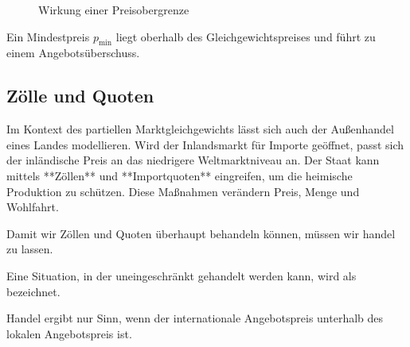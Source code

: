 \begin{figure}[h!]
\centering
{}
\caption{Wirkung einer Preisobergrenze}
\end{figure}

Ein Mindestpreis \( p_{\text{min}} \) liegt oberhalb des Gleichgewichtspreises und führt zu einem Angebotsüberschuss.



\subsection{Zölle und Quoten}

Im Kontext des partiellen Marktgleichgewichts lässt sich auch der Außenhandel eines Landes modellieren. Wird der Inlandsmarkt für Importe geöffnet, passt sich der inländische Preis an das niedrigere Weltmarktniveau an. Der Staat kann mittels **Zöllen** und **Importquoten** eingreifen, um die heimische Produktion zu schützen. Diese Maßnahmen verändern Preis, Menge und Wohlfahrt.


Damit wir Zöllen und Quoten überhaupt behandeln können, müssen wir handel zu lassen.


\begin{definition} 
	Eine Situation, in der uneingeschränkt gehandelt werden kann, wird als
	 bezeichnet.
\end{definition}

Handel ergibt nur Sinn, wenn der internationale Angebotspreis unterhalb des lokalen Angebotspreis ist.

